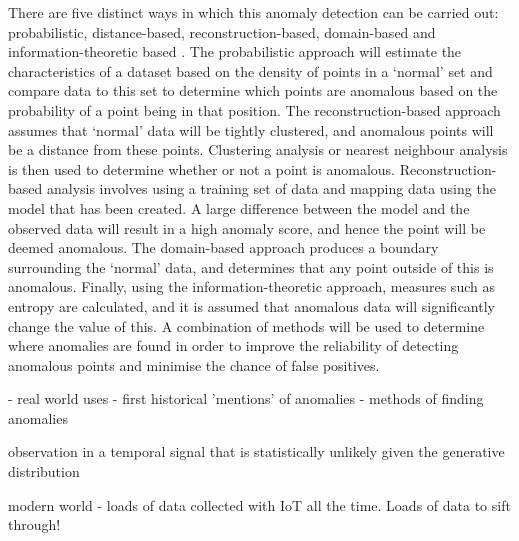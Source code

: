 There are five distinct ways in which this anomaly detection can be carried out: probabilistic, distance-based, reconstruction-based, domain-based and information-theoretic based \cite{Pimentel2014215}. The probabilistic approach will estimate the characteristics of a dataset based on the density of points in a `normal' set and compare data to this set to determine which points are anomalous based on the probability of a point being in that position. The reconstruction-based approach assumes that `normal' data will be tightly clustered, and anomalous points will be a distance from these points. Clustering analysis or nearest neighbour analysis is then used to determine whether or not a point is anomalous. Reconstruction-based analysis involves using a training set of data and mapping data using the model that has been created. A large difference between the model and the observed data will result in a high anomaly score, and hence the point will be deemed anomalous. The domain-based approach produces a boundary surrounding the `normal' data, and determines that any point outside of this is anomalous. Finally, using the information-theoretic approach, measures such as entropy are calculated, and it is assumed that anomalous data will significantly change the value of this. A combination of methods will be used to determine where anomalies are found in order to improve the reliability of detecting anomalous points and minimise the chance of false positives.

- real world uses
- first historical 'mentions' of anomalies
- methods of finding anomalies

observation in a temporal signal that is statistically unlikely
given the generative distribution

modern world - loads of data collected with IoT all the time. Loads of data to sift through!

